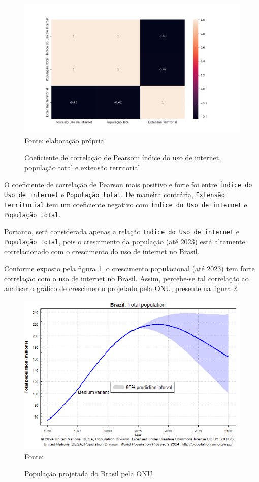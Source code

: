 \begin{figure}[ht]
    \centering
    \caption{Coeficiente de correlação de Pearson: índice do uso de internet, população total e extensão territorial}
    \includegraphics[width=1\linewidth]{figuras/internet/correlacao.png}
    \label{fig:internet_correlacao}
    \footnotesize{Fonte: elaboração própria}
\end{figure}

\newpage
O coeficiente de correlação de Pearson mais positivo e forte foi entre \texttt{Índice do Uso de internet} e \texttt{População total}. De maneira contrária, \texttt{Extensão territorial} tem um coeficiente negativo com \texttt{Índice do Uso de internet} e \texttt{População total}. 

Portanto, será considerada apenas a relação \texttt{Índice do Uso de internet} e \texttt{População total}, pois o crescimento da população (até 2023) está altamente correlacionado com o crescimento do uso de internet no Brasil.

Conforme exposto pela figura \ref{fig:internet_correlacao}, o crescimento populacional (até 2023) tem forte correlação com o uso de  internet no Brasil. Assim, percebe-se tal correlação ao analisar o gráfico de crescimento projetado pela ONU, presente na figura \ref{fig:populacao_brasil}.

\begin{figure}[ht]
    \centering
    \caption{População projetada do Brasil pela ONU}
    \includegraphics[width=1\linewidth]{figuras/populacao/populacao_brasil.png}
    \label{fig:populacao_brasil}
    \footnotesize{Fonte: \cite{ONU_populacao_brasil}}
\end{figure}

